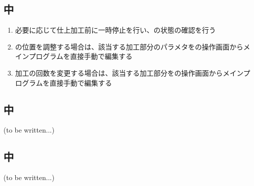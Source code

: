 \clearpage
\subsection{\EndFaceInCChamferMilling 中}
\begin{enumerate}[label=\sarrow]
\item 必要に応じて仕上加工前に一時停止を行い、\EndFaceInCChamfer の状態の確認を行う
\item \EndFaceInCChamfer の位置を調整する場合は、該当する加工部分のパラメタを\MMC の操作画面からメインプログラムを直接手動で編集する
\item {}加工の回数を変更する場合は、該当する加工部分を\MMC の操作画面からメインプログラムを直接手動で編集する
\end{enumerate}


\subsection{\EndFaceBoringMilling 中\TBW}
(to be written...)


\subsection{\IncutBoringMilling 中\TBW}
(to be written...)



\clearpage


